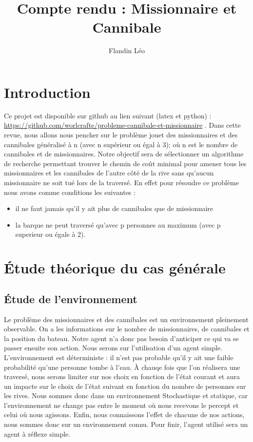 \documentclass[a4paper, 12pt, french,oneside]{book}
\title{Compte rendu : Missionnaire et Cannibale}
\author{Flandin Léo}
\begin{document}
\maketitle
\tableofcontents

\mainmatter

\chapter{Introduction}
Ce projet est disponible sur github au lien suivant (latex et python) : \url{https://github.com/worlcrafte/probleme-cannibale-et-missionnaire} .
Dans cette revue, nous allons nous pencher sur le problème jouet des missionnaires et des cannibales généralisé à n (avec n supérieur ou égal à 3); où n est le nombre de cannibales et de missionnaires. Notre objectif sera de sélectionner un algorithme de recherche permettant trouver le chemin de coût minimal pour amener tous les missionnaires et les cannibales de l'autre côté de la rive sans qu'aucun missionnaire ne soit tué lors de la traversé. En effet pour résoudre ce problème nous avons comme conditions les suivantes :
\begin{itemize}
    \item il ne faut jamais qu'il y ait plus de cannibales que de missionnaire
    \item la barque ne peut traversé qu'avec p personnes au maximum (avec p superieur ou égale à 2).
\end{itemize}
\chapter{Étude théorique du cas générale}

\section{Étude de l'environnement}
Le problème des missionnaires et des cannibales est un environnement pleinement observable. On a les informations sur le nombre de missionnaires, de cannibales et la position du bateau. Notre agent n'a donc pas besoin d'anticiper ce qui va se passer ensuite son action. Nous serons sur l'utilisation d'un agent simple. L'environnement est déterministe : il n'est pas probable qu'il y ait une faible probabilité qu'une personne tombe à l'eau. À chauqe fois que l'on réalisera une traversé, nous serons limiter sur nos choix en fonction de l'état courant et aura un impacte sur le choix de l'état suivant en fonction du nombre de personnes sur les rives. Nous sommes donc dans un environnement Stochastique et statique, car l'environnement ne change pas entre le moment où nous recevons le percept et celui où nous agissons. Enfin, nous connaissons l'effet de chacune de nos actions, nous sommes donc sur un environnement connu. Pour finir, l'agent utilisé sera un agent à réflexe simple.
\end{document}
